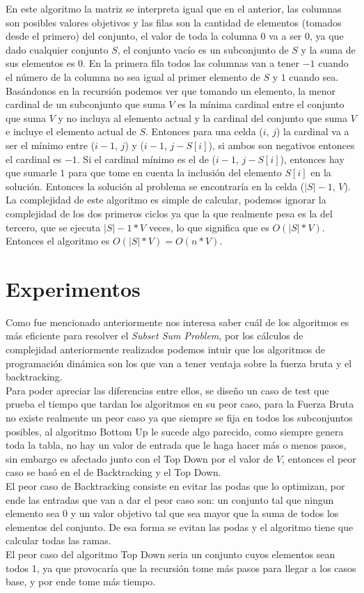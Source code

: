 \documentclass[a4paper]{article}
\begin{document}
En este algoritmo la matriz se interpreta igual que en el anterior, las columnas son posibles valores objetivos y las filas son la cantidad de elementos (tomados desde el primero) del conjunto, el valor de toda la columna $0$ va a ser $0$, ya que dado cualquier conjunto $S$, el conjunto vacío es un subconjunto de $S$ y la suma de sus elementos es $0$. En la primera fila todos las columnas van a tener $-1$ cuando el número de la columna no sea igual al primer elemento de $S$ y $1$ cuando sea. Basándonos en la recursión podemos ver que tomando un elemento, la menor cardinal de un subconjunto que suma $V$ es la mínima cardinal entre el conjunto que suma $V$ y no incluya al elemento actual y la cardinal del conjunto que suma $V$ e incluye el elemento actual de $S$. Entonces para una celda ($i$, $j$) la cardinal va a ser el mínimo entre ($i-1$, $j$) y
($i-1$, $j-S[i]$), si ambos son negativos entonces el cardinal es $-1$. Si el cardinal mínimo es el de ($i-1$, $j-S[i]$), entonces hay que sumarle $1$ para que tome en cuenta la inclusión del elemento $S[i]$ en la solución. Entonces la solución al problema se encontraría en la celda ($|S|-1$, $V$).
\\
La complejidad de este algoritmo es simple de calcular, podemos ignorar la complejidad de los dos primeros ciclos ya que la que realmente pesa es la del tercero, que se ejecuta $|S|-1 * V$ veces, lo que significa que es $O(|S|*V)$.
\\
Entonces el algoritmo es $O(|S|*V) = O(n*V)$.

\section{Experimentos}
Como fue mencionado anteriormente nos interesa saber cuál de los algoritmos es más eficiente para resolver el \textit{Subset Sum Problem}, por los cálculos de complejidad anteriormente realizados podemos intuir que los algoritmos de programación dinámica son los que van a tener ventaja sobre la fuerza bruta y el backtracking.
\\
Para poder apreciar las diferencias entre ellos, se diseño un caso de test que prueba el tiempo que tardan los algoritmos en su peor caso, para la Fuerza Bruta no existe realmente un peor caso ya que siempre se fija en todos los subconjuntos posibles, al algoritmo Bottom Up le sucede algo parecido, como siempre genera toda la tabla, no hay un valor de entrada que le haga hacer más o menos pasos, sin embargo es afectado junto con el Top Down por el valor de $V$, entonces el peor caso se basó en el de Backtracking y el Top Down. 
\\
El peor caso de Backtracking consiste en evitar las podas que lo optimizan, por ende las entradas que van a dar el peor caso son: un conjunto tal que ningun elemento sea 0 y un valor objetivo tal que sea mayor que la suma de todos los elementos del conjunto. De esa forma se evitan las podas y el algoritmo tiene que calcular todas las ramas.
\\
El peor caso del algoritmo Top Down seria un conjunto cuyos elementos sean todos 1, ya que provocaría que la recursión tome más pasos para llegar a los casos base, y por ende tome más tiempo.
\\
\end{document}
